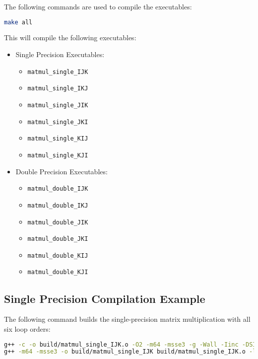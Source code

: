 \documentclass[12pt]{article}
\begin{document}
The following commands are used to compile the executables:

\begin{lstlisting}[language=bash, caption=Makefile build commands]
make all
\end{lstlisting}

This will compile the following executables:

\begin{itemize}
    \item Single Precision Executables: 
    \begin{itemize}
        \item \texttt{matmul\_single\_IJK}
        \item \texttt{matmul\_single\_IKJ}
        \item \texttt{matmul\_single\_JIK}
        \item \texttt{matmul\_single\_JKI}
        \item \texttt{matmul\_single\_KIJ}
        \item \texttt{matmul\_single\_KJI}
    \end{itemize}
    \item Double Precision Executables:
    \begin{itemize}
        \item \texttt{matmul\_double\_IJK}
        \item \texttt{matmul\_double\_IKJ}
        \item \texttt{matmul\_double\_JIK}
        \item \texttt{matmul\_double\_JKI}
        \item \texttt{matmul\_double\_KIJ}
        \item \texttt{matmul\_double\_KJI}
    \end{itemize}
\end{itemize}

\subsection{Single Precision Compilation Example}

The following command builds the single-precision matrix multiplication with all six loop orders:

\begin{lstlisting}[language=bash]
g++ -c -o build/matmul_single_IJK.o -O2 -m64 -msse3 -g -Wall -Iinc -DSINGLE -DORDER_IJK src/matmul.cpp
g++ -m64 -msse3 -o build/matmul_single_IJK build/matmul_single_IJK.o -lrt
\end{lstlisting}
\end{document}
